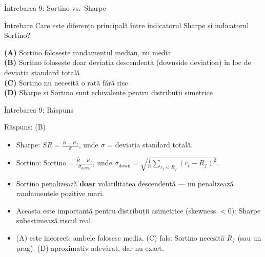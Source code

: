 \documentclass[9pt, aspectratio=169, t]{beamer}
\theoremstyle{definition}
\newenvironment{cminipage}[1]{%
    \par\noindent\hfill\begin{minipage}{#1}\ignorespaces
}{%
    \end{minipage}\hfill\null\par
}
\begin{document}
\begin{frame}{Întrebarea 9: Sortino vs.\ Sharpe}
    \begin{cminipage}{0.95\textwidth}
    \begin{block}{Întrebare}
    Care este diferența principală între indicatorul Sharpe și indicatorul Sortino?
    \end{block}

    \vspace{0.2cm}
    \textcolor{MainBlue}{\textbf{(A)}} Sortino folosește randamentul median, nu media\\[6pt]
    \textcolor{MainBlue}{\textbf{(B)}} Sortino folosește doar deviația descendentă (downside deviation) în loc de deviația standard totală\\[6pt]
    \textcolor{MainBlue}{\textbf{(C)}} Sortino nu necesită o rată fără risc\\[6pt]
    \textcolor{MainBlue}{\textbf{(D)}} Sharpe și Sortino sunt echivalente pentru distribuții simetrice
    \end{cminipage}
\end{frame}

\begin{frame}{Întrebarea 9: Răspuns}
    \begin{cminipage}{0.95\textwidth}
    \begin{exampleblock}{Răspuns: (B)}
    \begin{itemize}
        \item Sharpe: $SR = \frac{\bar{R} - R_f}{\sigma}$, unde $\sigma$ = deviația standard totală.
        \item Sortino: $\text{Sortino} = \frac{\bar{R} - R_f}{\sigma_{\text{down}}}$, unde $\sigma_{\text{down}} = \sqrt{\frac{1}{n}\sum_{r_t < R_f}(r_t - R_f)^2}$.
        \item Sortino penalizează \textbf{doar} volatilitatea descendentă — nu penalizează randamentele pozitive mari.
        \item Aceasta este importantă pentru distribuții asimetrice (skewness $< 0$): Sharpe subestimează riscul real.
        \item (A) este incorect: ambele folosesc media. (C) fals: Sortino necesită $R_f$ (sau un prag). (D) aproximativ adevărat, dar nu exact.
    \end{itemize}
    \end{exampleblock}
    \end{cminipage}
\end{frame}
\end{document}
